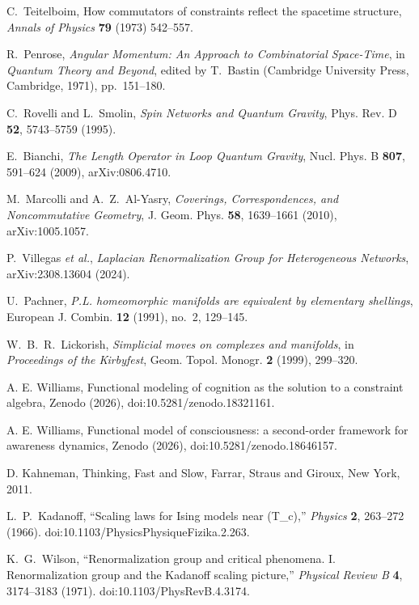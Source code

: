 \documentclass[10pt,twoside,a5paper]{article}
\theoremstyle{definition}
\begin{document}
\begin{eref}
C.~Teitelboim,
How commutators of constraints reflect the spacetime structure,
\emph{Annals of Physics} \textbf{79} (1973) 542--557.

R.~Penrose,
\emph{Angular Momentum: An Approach to Combinatorial Space-Time},
in \emph{Quantum Theory and Beyond}, edited by T.~Bastin
(Cambridge University Press, Cambridge, 1971), pp.~151--180.

C.~Rovelli and L.~Smolin,
\emph{Spin Networks and Quantum Gravity},
Phys. Rev. D \textbf{52}, 5743--5759 (1995).

E.~Bianchi,
\emph{The Length Operator in Loop Quantum Gravity},
Nucl. Phys. B \textbf{807}, 591--624 (2009),
arXiv:0806.4710.

M.~Marcolli and A.~Z.~Al-Yasry,
\emph{Coverings, Correspondences, and Noncommutative Geometry},
J. Geom. Phys. \textbf{58}, 1639--1661 (2010),
arXiv:1005.1057.

P.~Villegas \emph{et al.},
\emph{Laplacian Renormalization Group for Heterogeneous Networks},
arXiv:2308.13604 (2024).

U.~Pachner,
\emph{P.L. homeomorphic manifolds are equivalent by elementary shellings},
European J. Combin. \textbf{12} (1991), no.~2, 129--145.

W.~B.~R.~Lickorish,
\emph{Simplicial moves on complexes and manifolds},
in \emph{Proceedings of the Kirbyfest},
Geom. Topol. Monogr. \textbf{2} (1999), 299--320.

A. E. Williams, Functional modeling of cognition as the solution to a constraint
algebra, Zenodo (2026), doi:10.5281/zenodo.18321161.

A. E. Williams, Functional model of consciousness: a second-order framework for
awareness dynamics, Zenodo (2026), doi:10.5281/zenodo.18646157.

D. Kahneman, Thinking, Fast and Slow, Farrar, Straus and Giroux, New York, 2011.

L.~P.~Kadanoff,
``Scaling laws for Ising models near (T_c),''
\emph{Physics} \textbf{2}, 263--272 (1966).
doi:10.1103/PhysicsPhysiqueFizika.2.263.

K.~G.~Wilson,
``Renormalization group and critical phenomena. I. Renormalization group and
the Kadanoff scaling picture,''
\emph{Physical Review B} \textbf{4}, 3174--3183 (1971).
doi:10.1103/PhysRevB.4.3174.


\end{eref}
\end{document}
